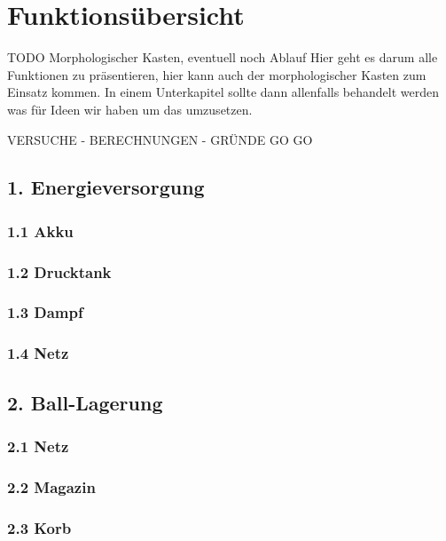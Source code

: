 \section{Funktionsübersicht}
TODO Morphologischer Kasten, eventuell noch Ablauf Hier geht es darum alle Funktionen zu präsentieren, hier kann auch der morphologischer Kasten zum Einsatz kommen.
In einem Unterkapitel sollte dann allenfalls behandelt werden was für Ideen wir haben um das umzusetzen.

VERSUCHE - BERECHNUNGEN - GRÜNDE GO GO

\subsection{1. Energieversorgung}

\subsubsection{1.1 Akku}

\subsubsection{1.2 Drucktank}

\subsubsection{1.3 Dampf}

\subsubsection{1.4 Netz}

\subsection{2. Ball-Lagerung}

\subsubsection{2.1 Netz}

\subsubsection{2.2 Magazin}

\subsubsection{2.3 Korb}

